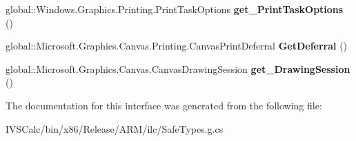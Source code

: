 \begin{DoxyCompactItemize}
\mbox{\label{interface_microsoft_1_1_graphics_1_1_canvas_1_1_printing_1_1_i_canvas_preview_event_args_a90316527a368a9c28b4a5f6c48a79ff5}} 
global\+::\+Windows.\+Graphics.\+Printing.\+Print\+Task\+Options {\bfseries get\+\_\+\+Print\+Task\+Options} ()
\item 
\mbox{\label{interface_microsoft_1_1_graphics_1_1_canvas_1_1_printing_1_1_i_canvas_preview_event_args_ac14e8353363cc191ad46607fb56c0566}} 
global\+::\+Microsoft.\+Graphics.\+Canvas.\+Printing.\+Canvas\+Print\+Deferral {\bfseries Get\+Deferral} ()
\item 
\mbox{\label{interface_microsoft_1_1_graphics_1_1_canvas_1_1_printing_1_1_i_canvas_preview_event_args_a3986afef79f94250c88e589b3a6c7bf8}} 
global\+::\+Microsoft.\+Graphics.\+Canvas.\+Canvas\+Drawing\+Session {\bfseries get\+\_\+\+Drawing\+Session} ()
\end{DoxyCompactItemize}


The documentation for this interface was generated from the following file\+:\begin{DoxyCompactItemize}
\item 
I\+V\+S\+Calc/bin/x86/\+Release/\+A\+R\+M/ilc/Safe\+Types.\+g.\+cs\end{DoxyCompactItemize}
